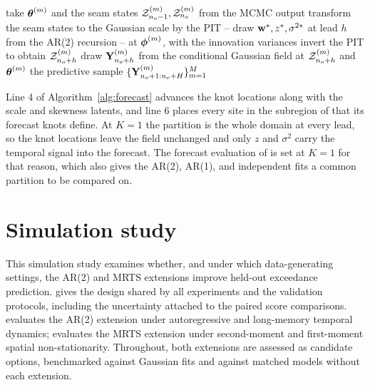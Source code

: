 \documentclass[12pt]{article}
\begin{document}
\begin{algorithm}[htbp]
\caption[Posterior predictive forecast over a held-out window]{Posterior
predictive forecast over the forecast window $(n_o,\, n_o + H]$.}
\label{alg:forecast}
\begin{algorithmic}[1]
    \State take $\mbox{\boldmath $\theta$}^{(m)}$ and the seam states
           ${\cal Z}^{(m)}_{n_o-1}, {\cal Z}^{(m)}_{n_o}$ from the MCMC output
    \State transform the seam states to the Gaussian scale by the PIT
           --
      \State draw $\mbox{\bf w}^*, z^*, \sigma^{2*}$ at lead $h$ from the AR(2)
             recursion -- at
             $\mbox{\boldmath $\phi$}^{(m)}$, with the innovation variances
      \State invert the PIT to obtain ${\cal Z}^{(m)}_{n_o+h}$
      \State draw $\mbox{\bf Y}^{(m)}_{n_o+h}$ from the conditional Gaussian field
              at ${\cal Z}^{(m)}_{n_o+h}$ and
             $\mbox{\boldmath $\theta$}^{(m)}$
    \EndFor
  \EndFor
  \State \Return the predictive sample
         $\{\mbox{\bf Y}^{(m)}_{n_o+1:n_o+H}\}_{m=1}^{M}$
\end{algorithmic}
\end{algorithm}

Line 4 of Algorithm~\ref{alg:forecast} advances the knot locations along with
the scale and skewness latents, and line 6 places every site in the subregion
of  that its forecast knots define.  At $K = 1$ the
partition is the whole domain at every lead, so the knot locations leave the
field unchanged and only $z$ and $\sigma^2$ carry the temporal signal into the
forecast.  The forecast evaluation of  is set at
$K = 1$ for that reason, which also gives the AR(2), AR(1), and independent
fits a common partition to be compared on.

\section{Simulation study}\label{sec:simulation}

This simulation study examines whether, and under which data-generating settings, the AR(2) and MRTS extensions improve held-out exceedance prediction.   gives the design shared by all experiments and  the validation protocols, including the uncertainty attached to the paired score comparisons.   evaluates the AR(2) extension under autoregressive and long-memory temporal dynamics;  evaluates the MRTS extension under second-moment and first-moment spatial non-stationarity.  Throughout, both extensions are assessed as candidate options, benchmarked against Gaussian fits and against matched models without each extension.
\end{document}
